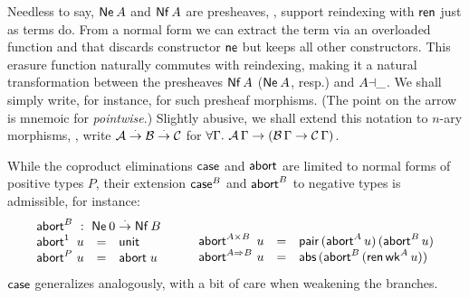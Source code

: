 \documentclass[a4paper,USenglish,cleveref, autoref]{lipics-v2019}
\begin{document}
Needless to say, $\mathsf{Ne}^{}\,A$ and
$\mathsf{Nf}\,A$ are presheaves, \ie, support reindexing with $\mathsf{ren}$ just as terms do.
From a normal form we can extract the term via an overloaded function
 and
that discards constructor $\mathsf{ne}$ but keeps all other constructors.
This erasure function naturally commutes with reindexing, making it a
natural transformation between the presheaves $\mathsf{Nf}\,A$ ($\mathsf{Ne}^{}\,A$,
resp.) and $A{\dashv}\_$.  We shall simply write, for instance,
 for such presheaf morphisms.
(The point on the arrow is mnemoic for \emph{pointwise}.)
Slightly abusive, we shall extend this notation to $n$-ary
morphisms, \eg, write $\mathcal{A} \stackrel{\cdot}{\to} \mathcal{B} \stackrel{\cdot}{\to} \mathcal{C}$ for
$\forall \Gamma.\ \mathcal{A}\,\Gamma \to (\mathcal{B}\,\Gamma \to \mathcal{C}\,\Gamma)$.

While the coproduct eliminations $\mathsf{case}$ and $\mathsf{abort}$ are limited to
normal forms of positive types $P$, their extension $\mathsf{case}^B$ and
$\mathsf{abort}^B$ to negative types
is admissible, for instance:
\[
\begin{array}{l@{~}lcl}
  \multicolumn 4 l {\tabort^B ~:~ \tNe\, 0 \todot \tNf\,B} \\
  \tabort^{\tyone}     & u & = & \tunit \\
  \tabort^P           & u & = & \tabort\;u \\
\end{array}
\qquad
\begin{array}{l@{~}lcl}
  \\
  \tabort^{A \times B} & u & = & \tpair\,(\tabort^A\,u)\,(\tabort^B\,u) \\
  \tabort^{A \To B}    & u & = & \tabs\,(\tabort^B\,(\tren\,\twk^A\,u)) \\
\end{array}
\]
$\mathsf{case}$ generalizes analogously, with a bit of care when weakening
the branches.
\end{document}
